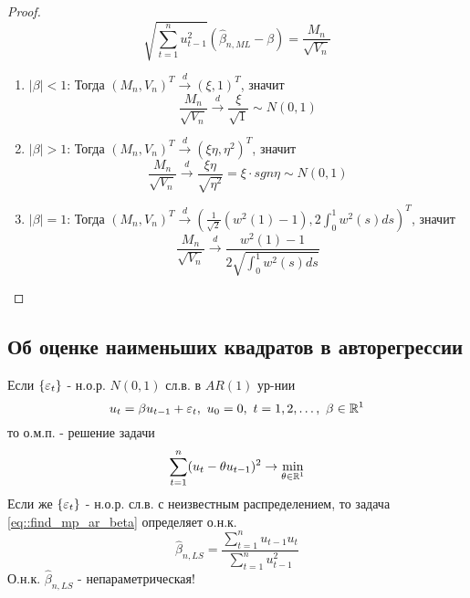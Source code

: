 \begin{proof}
    \[\sqrt{\sum_{t=1}^nu^2_{t-1}}(\widehat{\beta}_{n,ML}-\beta)=\frac{M_n}{\sqrt{V_n}}\]
    \begin{enumerate}
        \item \underline{$\left\lvert \beta\right\rvert <1$}: Тогда $(M_n,V_n)^T\xrightarrow{d}(\xi,1)^T$, значит 
        \[\frac{M_n}{\sqrt{V_n}}\xrightarrow{d}\frac{\xi}{\sqrt{1}}\sim N(0,1)\]
        \item \underline{$\left\lvert \beta\right\rvert >1$}: Тогда $(M_n,V_n)^T\xrightarrow{d}(\xi\eta,\eta^2)^T$, значит 
        \[\frac{M_n}{\sqrt{V_n}}\xrightarrow{d}\frac{\xi\eta}{\sqrt{\eta^2}}=\xi\cdot sgn\eta\sim N(0,1)\]
        \item \underline{$\left\lvert \beta\right\rvert =1$}: Тогда $(M_n,V_n)^T\xrightarrow{d}\left(\frac{1}{\sqrt{2}}(w^2(1)-1),2\int_0^1w^2(s)ds\right)^T$, значит 
        \[\frac{M_n}{\sqrt{V_n}}\xrightarrow{d}\frac{w^2(1)-1}{2\sqrt{\int_0^1w^2(s)ds}}\]
    \end{enumerate}
\end{proof}

\subsection{Об оценке наименьших квадратов в авторегрессии}
Если $\{\varepsilon_t\}$ - н.о.р. $N(0,1)$ сл.в. в $AR(1)$ ур-нии
\begin{equation}
    u_t=\beta u_{t-1}+\eps_t,\ u_0=0,\ t=1,2,\ldots,\ \beta\in\R^1
\end{equation}
то о.м.п. - решение задачи
\begin{equation} \label{eq::find_mp_ar_beta}
    \sum_{t=1}^n(u_t-\theta u_{t-1})^2\rightarrow\min_{\theta\in\mathbb{R}^1}
\end{equation}
Если же $\{\varepsilon_t\}$ - н.о.р. сл.в. с неизвестным распределением, то задача \eqref{eq::find_mp_ar_beta}
определяет о.н.к.
\[\widehat{\beta}_{n,LS}=\frac{\sum_{t=1}^nu_{t-1}u_{t}}{\sum_{t=1}^nu^2_{t-1}}\]
О.н.к. $\widehat{\beta}_{n,LS}$ - непараметрическая!

